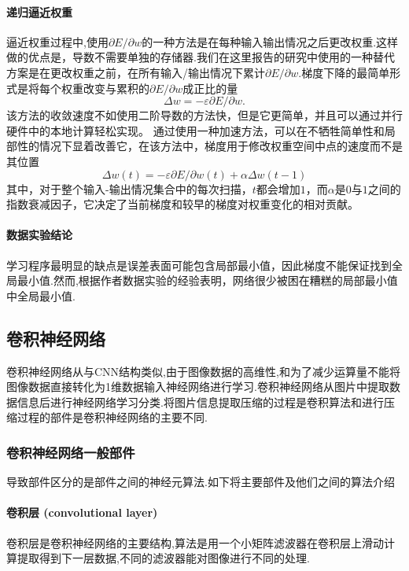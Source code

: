 \paragraph{递归逼近权重}

逼近权重过程中,使用$\partial E/ \partial w$的一种方法是在每种输入输出情况之后更改权重.这样做的优点是，导数不需要单独的存储器.我们在这里报告的研究中使用的一种替代方案是在更改权重之前，在所有输入/输出情况下累计$\partial E/ \partial w$.梯度下降的最简单形式是将每个权重改变与累积的$\partial E/ \partial w$成正比的量
\[ \Delta w = -\varepsilon \partial E / \partial w.\]
该方法的收敛速度不如使用二阶导数的方法快，但是它更简单，并且可以通过并行硬件中的本地计算轻松实现。 通过使用一种加速方法，可以在不牺牲简单性和局部性的情况下显着改善它，在该方法中，梯度用于修改权重空间中点的速度而不是其位置
\[\Delta w(t) = - \varepsilon \partial E /\partial w(t) + \alpha \Delta w(t-1)\]
其中，对于整个输入-输出情况集合中的每次扫描，$t$都会增加$1$，而$\alpha$是$0$与$1$之间的指数衰减因子，它决定了当前梯度和较早的梯度对权重变化的相对贡献。


\paragraph{数据实验结论}

学习程序最明显的缺点是误差表面可能包含局部最小值，因此梯度不能保证找到全局最小值.然而,根据作者数据实验的经验表明，网络很少被困在糟糕的局部最小值中全局最小值.

\subsection{卷积神经网络\cite{LeCun1989}}

卷积神经网络从与CNN结构类似,由于图像数据的高维性,和为了减少运算量不能将图像数据直接转化为1维数据输入神经网络进行学习.卷积神经网络从图片中提取数据信息后进行神经网络学习分类.将图片信息提取压缩的过程是卷积算法和进行压缩过程的部件是卷积神经网络的主要不同.

\subsubsection{卷积神经网络一般部件}
导致部件区分的是部件之间的神经元算法.如下将主要部件及他们之间的算法介绍

\paragraph{卷积层 (convolutional layer)}
卷积层是卷积神经网络的主要结构,算法是用一个小矩阵滤波器在卷积层上滑动计算提取得到下一层数据,不同的滤波器能对图像进行不同的处理.

